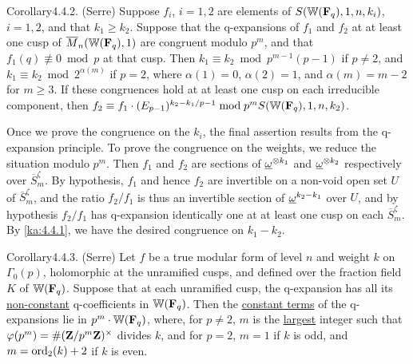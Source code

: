 \begin{kathm}{Corollary}{4.4.2.}
(Serre) Suppose $f_i$, $i=1,2$ are elements of $S(\mathbb{W}(\mathbf{F}_q),1,n,k_i)$, $i=1,2$,
and that $k_1\geq k_2$. Suppose that the q-expansions of $f_1$ and $f_2$ at at
least one cusp of $\overline{M}_n(\mathbb{W}(\mathbf{F}_q),1)$ are congruent modulo $p^m$, and that
$f_1(q)\not\equiv 0 \bmod p$ at that cusp. Then $k_1\equiv k_2 \bmod
p^{m-1}(p-1)$ if $p\neq 2$, and $k_1\equiv k_2 \bmod 2^{\alpha(m)}$ if $p=2$,
where $\alpha(1)=0$, $\alpha(2)=1$, and $\alpha(m)=m-2$ for $m\geq 3$. If these
congruences hold at at least one cusp on each irreducible component, then
$f_2\equiv f_1\cdot(E_{p-1})^{k_2-k_1/p-1} \bmod p^mS(\mathbb{W}(\mathbf{F}_q),1,n,k_2)$.
\end{kathm}

\begin{kaproof}
Once we prove the congruence on the $k_i$, the final assertion results from the
q-expansion principle. To prove the congruence on the weights, we reduce the
situation modulo $p^m$. Then $f_1$ and $f_2$ are sections of $\underline{\omega}^{\otimes k_1}$
and $\underline{\omega}^{\otimes k_2}$ respectively over $\overline{S}_m^\zeta$. By hypothesis,
$f_1$ and hence $f_2$ are invertible on a non-void open set $U$ of
$\overline{S}_m^\zeta$, and the ratio $f_2/f_1$ is thus an invertible section of
$\underline{\omega}^{k_2-k_1}$ over $U$, and by hypothesis $f_2/f_1$ has q-expansion identically
one at at least one cusp on each $\overline{S}_m^\zeta$. By \eqref{ka:4.4.1}, we have the
desired congruence on $k_1-k_2$.
\end{kaproof}

\begin{kathm}{Corollary}{4.4.3.}
(Serre) Let $f$ be a true modular form of level $n$ and weight $k$ on
$\Gamma_0(p)$, holomorphic at the unramified cusps, and defined over the
fraction field $K$ of $\mathbb{W}(\mathbf{F}_q)$. Suppose that at each unramified cusp, the
q-expansion has all its \uline{non-constant} q-coefficients in $\mathbb{W}(\mathbf{F}_q)$. Then
the \uline{constant terms} of the q-expansions lie in $p^m\cdot\mathbb{W}(\mathbf{F}_q)$, where,
for $p\neq 2$, $m$ is the \uline{largest} integer such that
$\varphi(p^m)=\#(\mathbf{Z}/p^m\mathbf{Z})^\times$ divides $k$, and for $p=2$, $m=1$ if $k$ is
odd, and $m=\operatorname{ord}_2(k)+2$ if $k$ is even.
\end{kathm}

